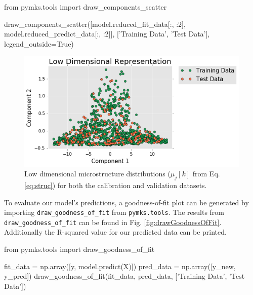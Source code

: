 \documentclass{bmcart}
\newcommand{\fimage}
{\fcolorbox{outcolor}{white}}
{}
\begin{document}
\begin{_input}
from pymks.tools import draw_components_scatter

draw_components_scatter([model.reduced_fit_data[:, :2],
                         model.reduced_predict_data[:, :2]],
                        ['Training Data', 'Test Data'],
                        legend_outside=True)

\end{_input}

\begin{figure}
    \centering
    \includegraphics[scale=.61]{pymks_paper_homogenization_files/pymks_paper_homogenization_23_0.png}
    \caption{Low dimensional microstructure distributions ($\mu_j[k]$ from Eq. \ref{eq:struc}) for both the calibration and validation
    datasets.}
    \label{fig:drawComponentsScatter}
\end{figure}


    To evaluate our model's predictions, a goodness-of-fit plot can
be generated by importing \texttt{draw\_goodness\_of\_fit} from
\texttt{pymks.tools}. The results from \texttt{draw\_goodness\_of\_fit}
can be found in Fig. \ref{fig:drawGoodnessOfFit}. Additionally the R-squared
value for our predicted data can be printed.

\begin{_input}
from pymks.tools import draw_goodness_of_fit

fit_data = np.array([y, model.predict(X)])
pred_data = np.array([y_new, y_pred])
draw_goodness_of_fit(fit_data, pred_data,
                     ['Training Data', 'Test Data'])
\end{_input}
\end{document}

